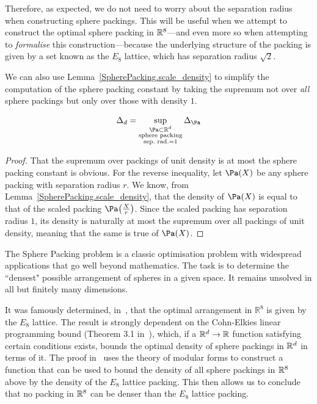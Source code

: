 Therefore, as expected, we do not need to worry about the separation radius when constructing sphere packings. This will be useful when we attempt to construct the optimal sphere packing in $\mathbb{R}^8$---and even more so when attempting to \emph{formalise} this construction---because the underlying structure of the packing is given by a set known as the $E_8$ lattice, which has separation radius $\sqrt{2}$.

We can also use Lemma~\ref{SpherePacking.scale_density} to simplify the computation of the sphere packing constant by taking the supremum not over \emph{all} sphere packings but only over those with density $1$.

\begin{lemma}\label{SpherePacking.constant_eq_constant_normalized}\leanok
  \[
    \Delta_d = \sup\limits_{\substack{\Pa \subset \R^d \\ \text{sphere packing} \\ \text{sep.~rad.} = 1}} \Delta_{\Pa}
  \]
\end{lemma}
\begin{proof}\leanok
  That the supremum over packings of unit density is at most the sphere packing constant is obvious. For the reverse inequality, let $\Pa(X)$ be any sphere packing with separation radius $r$. We know, from Lemma~\ref{SpherePacking.scale_density}, that the density of $\Pa(X)$ is equal to that of the scaled packing $\Pa\!\left(\frac{X}{r}\right)$. Since the scaled packing has separation radius $1$, its density is naturally at most the supremum over all packings of unit density, meaning that the same is true of $\Pa(X)$.
\end{proof}


The Sphere Packing problem is a classic optimisation problem with widespread applications that go well beyond mathematics. The task is to determine the ``densest" possible arrangement of spheres in a given space. It remains unsolved in all but finitely many dimensions.

It was famously determined, in~\cite{Via2017}, that the optimal arrangement in $\mathbb{R}^8$ is given by the $E_8$ lattice. The result is strongly dependent on the Cohn-Elkies linear programming bound (Theorem 3.1 in~\cite{ElkiesCohn}), which, if a $\mathbb{R}^d \to \mathbb{R}$ function satisfying certain conditions exists, bounds the optimal density of sphere packings in $\mathbb{R}^d$ in terms of it. The proof in~\cite{Via2017} uses the theory of modular forms to construct a function that can be used to bound the density of all sphere packings in $\mathbb{R}^8$ above by the density of the $E_8$ lattice packing. This then allows us to conclude that no packing in $\mathbb{R}^8$ can be denser than the $E_8$ lattice packing.

